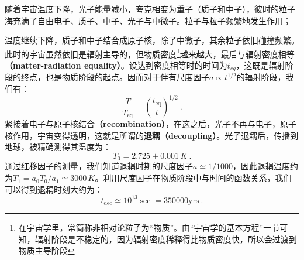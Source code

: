 随着宇宙温度下降，光子能量减小，夸克相变为重子（质子和中子），彼时的粒子海充满了自由电子、质子、中子、光子与中微子。粒子与粒子频繁地发生作用；

温度继续下降，质子和中子结合成原子核，除了中微子，其余粒子依旧碰撞频繁。此时的宇宙虽然依旧是辐射主导的，但物质密度\footnote{在宇宙学里，常简称非相对论粒子为“物质”。由“宇宙学的基本方程”一节可知，辐射阶段是不稳定的，因为辐射密度稀释得比物质密度快，所以会过渡到物质主导阶段}越来越大，最后与辐射密度相等\textbf{（matter-radiation equality）}。设达到密度相等时的时间为$t_{eq}$，这既是辐射阶段的终点，也是物质阶段的起点。因而对于伴有尺度因子$a\propto t^{1/2}$的辐射阶段，我们有：
\begin{equation}
\frac T{T_\mathrm{eq}}=\left(\frac{t_\mathrm{eq}}t\right)^{1/2}~.
\end{equation}
紧接着电子与原子核结合\textbf{（recombination）}，在这之后，光子不再与电子，原子核作用，宇宙变得透明，这就是所谓的\textbf{退耦（decoupling）}。光子退耦后，传播到地球，被精确测得其温度为：
\begin{equation}
T_{0}=2.725 \pm 0.001 \,K~.
\end{equation}
通过红移因子的测量，我们知道退耦时期的尺度因子$a\simeq 1/1000$，因此退耦温度约为$T_1=a_0T_0/{a_1}\simeq 3000\,K$。利用尺度因子在物质阶段中与时间的函数关系，我们可以得到退耦时刻大约为：
\begin{equation}
t_{\mathrm{dec}}\simeq10^{13}\sec=350 000 \mathrm{yrs}~.
\end{equation}


